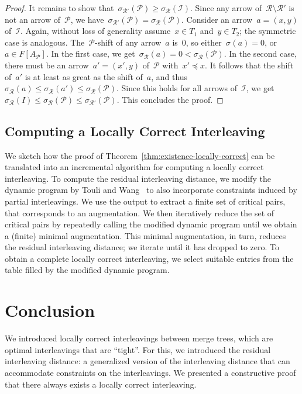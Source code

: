 \documentclass[a4paper,UKenglish, autoref, thm-restate, cleveref]{lipics-v2021}
\newcommand{\shift}[1]{\sigma_{#1}}
\newcommand{\I}{\mathcal{I}}
\renewcommand{\P}{\mathcal{P}}
\newcommand{\R}{\mathcal{R}}
\begin{document}
\begin{proof}
    It remains to show that~$\shift{\R'}(\P) \ge \shift{\R}(\I)$.
    Since any arrow of~$\R \setminus \R'$ is not an arrow of~$\P$, we have~$\shift{\R'}(\P) = \shift{\R}(\P)$.
    Consider an arrow~$a = (x, y)$ of~$\I$.
    Again, without loss of generality assume~$x \in T_1$ and~$y \in T_2$; the symmetric case is analogous.
    The~$\P$-shift of any arrow~$a$ is~$0$, so either~$\shift{}(a) = 0$, or $a \in F[A_\P]$.
    In the first case, we get~$\shift{\R}(a) = 0 < \shift{\R}(\P)$.
    In the second case, there must be an arrow~$a' = (x',y)$ of~$\P$ with~$x' \preceq x$.
    It follows that the shift of~$a'$ is at least as great as the shift of~$a$, and thus~$\shift{\R}(a) \le \shift{\R}(a') \le \shift{\R}(\P)$.
    Since this holds for all arrows of~$\I$, we get~$\shift{\R}(I) \le \shift{\R}(\P) \le \shift{\R'}(\P)$.
    This concludes the proof.
\end{proof}

\subsection{Computing a Locally Correct Interleaving}\label{sec:computing}
We sketch how the proof of Theorem~\ref{thm:existence-locally-correct} can be translated into an incremental algorithm for computing a locally correct interleaving.
To compute the residual interleaving distance, we modify the dynamic program by Touli and Wang~\cite{touli2022fpt} to also incorporate constraints induced by partial interleavings.
We use the output to extract a finite set of critical pairs, that corresponds to an augmentation.
We then iteratively reduce the set of critical pairs by repeatedly calling the modified dynamic program until we obtain a (finite) minimal augmentation.
This minimal augmentation, in turn, reduces the residual interleaving distance; we iterate until it has dropped to zero.
To obtain a complete locally correct interleaving, we select suitable entries from the table filled by the modified dynamic program.

\section{Conclusion}\label{sec:conclusion}
We introduced locally correct interleavings between merge trees, which are optimal interleavings that are ``tight''.
For this, we introduced the residual interleaving distance: a generalized version of the interleaving distance that can accommodate constraints on the interleavings.
We presented a constructive proof that there always exists a locally correct interleaving.
\end{document}
